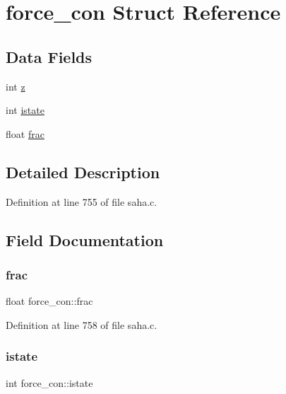 \hypertarget{structforce__con}{}\section{force\+\_\+con Struct Reference}
\label{structforce__con}
\subsection*{Data Fields}
\begin{DoxyCompactItemize}
\item 
int \hyperlink{structforce__con_a09f9e42431e42838f1664ad6b2a186a9}{z}
\item 
int \hyperlink{structforce__con_a11f5731d686a095c0336e6f90c396d6c}{istate}
\item 
float \hyperlink{structforce__con_a6fa826ae547d6821bf83dc84ca6a0494}{frac}
\end{DoxyCompactItemize}


\subsection{Detailed Description}


Definition at line 755 of file saha.\+c.



\subsection{Field Documentation}
\mbox{\label{structforce__con_a6fa826ae547d6821bf83dc84ca6a0494}} 
\subsubsection{\texorpdfstring{frac}{frac}}
{\footnotesize\ttfamily float force\+\_\+con\+::frac}



Definition at line 758 of file saha.\+c.

\mbox{\label{structforce__con_a11f5731d686a095c0336e6f90c396d6c}} 
\subsubsection{\texorpdfstring{istate}{istate}}
{\footnotesize\ttfamily int force\+\_\+con\+::istate}



